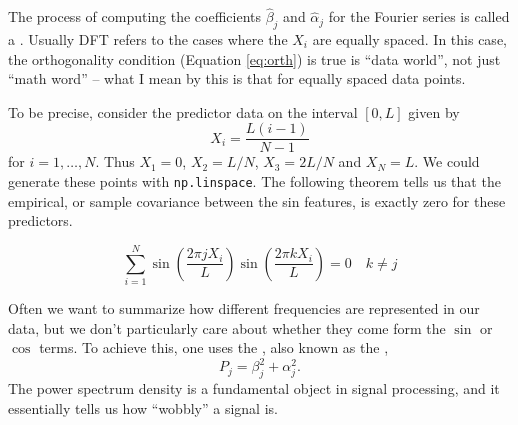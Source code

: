 The process of computing the coefficients $\hat{\beta}_j$ and $\hat{\alpha}_j$ for the Fourier series is called  a . Usually DFT refers to the cases where the $X_i$ are equally spaced. In this case, the orthogonality condition (Equation \ref{eq:orth}) is true is ``data world'', not just ``math word'' -- what I mean by this is that for equally spaced data points. 

To be precise, consider the predictor data on the interval $[0,L]$ given by 
\begin{equation*}
X_i = \frac{L(i-1)}{N-1}
\end{equation*}
for $i=1,\dots,N$. Thus $X_1 = 0$, $X_2 = L/N$, $X_3 = 2L/N$ and $X_N = L$. We could generate these points with \verb!np.linspace!. The following theorem tells us that the empirical, or sample covariance between the sin features, is exactly zero for these predictors.

\begin{thm}
\begin{equation*}
\sum_{i=1}^N\sin\left(\frac{2\pi j X_i}{L}\right) \sin\left(\frac{2\pi k X_i}{L}\right)  =0\quad k\ne j
\end{equation*}
\end{thm}


 Often we want to summarize how different frequencies are represented in our data, but we don't particularly care about whether they come form the $\sin$ or $\cos$ terms. To achieve this, one uses the , also known as the , 
\begin{equation*}
P_j = \beta_j^2 + \alpha_j^2. 
\end{equation*}
The power spectrum density is a fundamental object in signal processing, and it essentially tells us how ``wobbly'' a signal is. 





